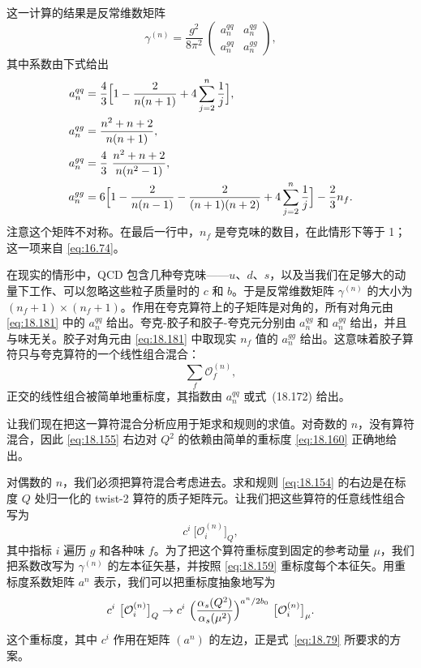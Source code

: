 这一计算的结果是反常维数矩阵
\begin{equation}
  \gamma^{(n)} = \frac{g^2}{8\pi^2}\ \begin{pmatrix}
    a_n^{qq} & a_n^{qg}\\ a_n^{gq} & a_n^{gg}
  \end{pmatrix} ,
  \label{eq:18.181}
\end{equation}
其中系数由下式给出
\begin{equation}
  \begin{aligned}
    a_n^{qq} &= \frac{4}{3}\Bigl[ 1 - \frac{2}{n(n+1)} + 4\sum_{j=2}^{n}
      \frac{1}{j} \Bigr],\\
    a_n^{qg} &= \frac{n^2+n+2}{n(n+1)},\\
    a_n^{gq} &= \frac{4}{3}\ \frac{n^2+n+2}{n(n^2-1)},\\
    a_n^{gg} &= 6\Bigl[ 1 - \frac{2}{n(n-1)} - \frac{2}{(n+1)(n+2)}
      + 4\sum_{j=2}^{n}\frac{1}{j} \Bigr] - \frac{2}{3}n_f .
  \end{aligned}
  \label{eq:18.181b}
\end{equation}
注意这个矩阵不对称。在最后一行中，$n_f$ 是夸克味的数目，在此情形下等于 1；这一项来自 \eqref{eq:16.74}。

在现实的情形中，QCD 包含几种夸克味——$u$、$d$、$s$，以及当我们在足够大的动量下工作、可以忽略这些粒子质量时的 $c$ 和 $b$。于是反常维数矩阵 $\gamma^{(n)}$ 的大小为 $(n_f+1)\times(n_f+1)$。作用在夸克算符上的子矩阵是对角的，所有对角元由 \eqref{eq:18.181} 中的 $a_n^{qq}$ 给出。夸克-胶子和胶子-夸克元分别由 $a_n^{qg}$ 和 $a_n^{gq}$ 给出，并且与味无关。胶子对角元由 \eqref{eq:18.181} 中取现实 $n_f$ 值的 $a_n^{gg}$ 给出。这意味着胶子算符只与夸克算符的一个线性组合混合：
\begin{equation}
  \sum_f \mathcal{O}^{(n)}_f ,
  \label{eq:18.182}
\end{equation}
正交的线性组合被简单地重标度，其指数由 $a_n^{qq}$ 或式~(18.172) 给出。

让我们现在把这一算符混合分析应用于矩求和规则的求值。对奇数的 $n$，没有算符混合，因此 \eqref{eq:18.155} 右边对 $Q^2$ 的依赖由简单的重标度 \eqref{eq:18.160} 正确地给出。

对偶数的 $n$，我们必须把算符混合考虑进去。求和规则 \eqref{eq:18.154} 的右边是在标度 $Q$ 处归一化的 twist-2 算符的质子矩阵元。让我们把这些算符的任意线性组合写为
\begin{equation}
  c^i\ \bigl[ \mathcal{O}^{(n)}_i \bigr]_Q ,
  \label{eq:18.183}
\end{equation}
其中指标 $i$ 遍历 $g$ 和各种味 $f$。为了把这个算符重标度到固定的参考动量 $\mu$，我们把系数改写为 $\gamma^{(n)}$ 的左本征矢基，并按照 \eqref{eq:18.159} 重标度每个本征矢。用重标度系数矩阵 $a^n$ 表示，我们可以把重标度抽象地写为
\begin{equation}
  c^i\ \bigl[ \mathcal{O}^{(n)}_i \bigr]_Q \to c^i\ \Bigl( \frac{\alpha_s(Q^2)}
    {\alpha_s(\mu^2)} \Bigr)^{a^n/2b_0}\ \bigl[ \mathcal{O}^{(n)}_i
      \bigr]_\mu .
  \label{eq:18.184}
\end{equation}
这个重标度，其中 $c^i$ 作用在矩阵 $(a^n)$ 的左边，正是式~\eqref{eq:18.79} 所要求的方案。

